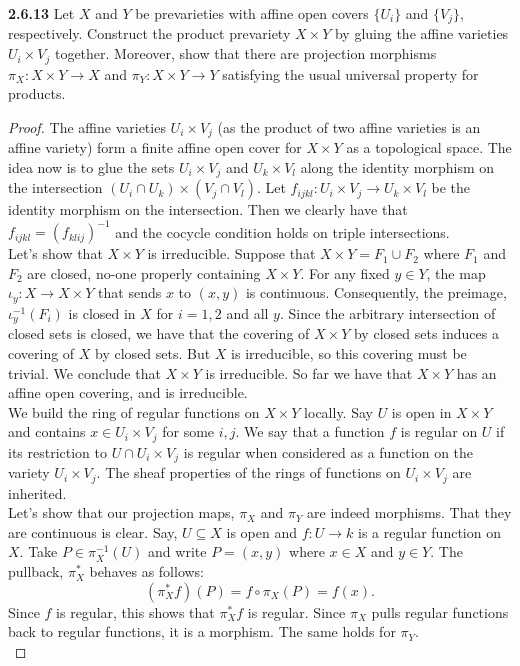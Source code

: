 \documentclass[11pt,letterpaper]{report}
\begin{document}
\noindent\textbf{2.6.13}
Let $X$ and $Y$ be prevarieties with affine open covers $\{U_i\}$ and $\{V_j\}$, respectively. Construct the product prevariety $X\times Y$ by gluing the affine varieties $U_i\times V_j$ together. Moreover, show that there are projection morphisms $\pi_X:X\times Y\to X$ and $\pi_Y:X\times Y\to Y$ satisfying the usual universal property for products.
\begin{proof}
	The affine varieties $U_i\times V_j$ (as the product of two affine varieties is an affine variety) form a finite affine open cover for $X\times Y$ as a topological space. The idea now is to glue the sets $U_i\times V_j$ and $U_k\times V_l$ along the identity morphism on the intersection $(U_i\cap U_k)\times (V_j\cap V_l)$. Let $f_{ijkl}:U_i\times V_j\to U_k\times V_l$ be the identity morphism on the intersection. Then we clearly have that $f_{ijkl} = (f_{klij})^{-1}$ and the cocycle condition holds on triple intersections.\\

	\noindent Let's show that $X\times Y$ is irreducible. Suppose that $X\times Y = F_1\cup F_2$ where $F_1$ and $F_2$ are closed, no-one properly containing $X\times Y$. For any fixed $y\in Y$, the map $\iota_y: X\to X\times Y$ that sends $x$ to $(x,y)$ is continuous. Consequently, the preimage, $\iota_y^{-1}(F_i)$ is closed in $X$ for $i=1,2$ and all $y$. Since the arbitrary intersection of closed sets is closed, we have that the covering of $X\times Y$ by closed sets induces a covering of $X$ by closed sets. But $X$ is irreducible, so this covering must be trivial. We conclude that $X\times Y$ is irreducible. So far we have that $X\times Y$ has an affine open covering, and is irreducible.\\

	\noindent We build the ring of regular functions on $X\times Y$ locally. Say $U$ is open in $X\times Y$ and contains $x\in U_i\times V_j$ for some $i,j$. We say that a function $f$ is regular on $U$ if its restriction to $U\cap U_i\times V_j$ is regular when considered as a function on the variety $U_i\times V_j$. The sheaf properties of the rings of functions on $U_i\times V_j$ are inherited.\\

	\noindent Let's show that our projection maps, $\pi_X$ and $\pi_Y$ are indeed morphisms. That they are continuous is clear. Say, $U\subseteq X$ is open and $f: U\to k$ is a regular function on $X$. Take $P\in \pi_X^{-1}(U)$ and write $P = (x, y)$ where $x\in X$ and $y\in Y$. The pullback, $\pi_X^*$ behaves as follows:
	\[
	(\pi_X^*f)(P) = f\circ \pi_X(P) = f(x).
	\]
	Since $f$ is regular, this shows that $\pi_X^*f$ is regular. Since $\pi_X$ pulls regular functions back to regular functions, it is a morphism. The same holds for $\pi_Y$.\\


\end{proof}
\end{document}
